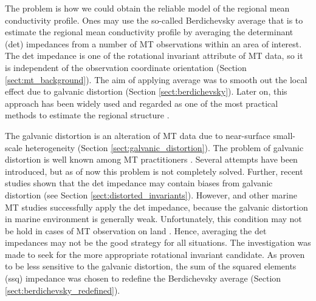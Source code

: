 

The problem is how we could obtain the reliable model of the regional mean conductivity profile.
	Ones may use the so-called Berdichevsky average \citep{berdichevsky1980a} that is to estimate the regional mean conductivity profile by averaging the determinant (det) impedances from a number of MT observations within an area of interest. 
	The det impedance is one of the rotational invariant attribute of MT data, so it is independent of the observation coordinate orientation (Section \ref{sect:mt_background}).
	The aim of applying average was to smooth out the local effect due to galvanic distortion (Section \ref{sect:berdichevsky}). 
	Later on, this approach has been widely used and regarded as one of the most practical methods to estimate the regional structure \citep[e.g.,][]{tournerie2002a, baba2010a, tada2014a, avdeeva2015a}.

	The galvanic distortion is an alteration of MT data due to near-surface small-scale heterogeneity (Section \ref{sect:galvanic_distortion}).
	The problem of galvanic distortion is well known among MT practitioners . Several attempts \citep[e.g.,][]{groom1989a, chave1994a, utada2000a, mcneice2001a, caldwell2004a, sasaki2006a, gomez-trevino2014a, avdeeva2015a, tietze2015a} have been introduced, but as of now this problem is not completely solved. 
	Further, recent studies \citep[e.g.,][]{gomez-trevino2013a, rung-arunwan2015a}  shown that the det impedance may contain biases from galvanic distortion (see Section \ref{sect:distorted_invariants}). 
However, \citet{baba2010a} and other marine MT studies successfully apply the det impedance, because the galvanic distortion in marine environment is generally weak. Unfortunately, this condition may not be hold in cases of MT observation on land \citep[e.g.,][]{berdichevsky1980a}.		
	Hence, averaging the det impedances may not be the good strategy for all situations.
	The investigation was made to seek for the more appropriate rotational invariant candidate.
	As proven to be less sensitive to the galvanic distortion, the sum of the squared elements (ssq) impedance \citep[first introduced by][]{szarka1997a} was chosen to redefine the Berdichevsky average (Section \ref{sect:berdichevsky_redefined}).

